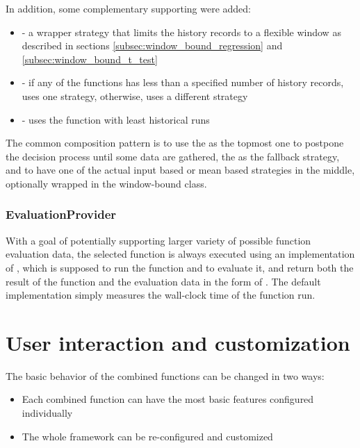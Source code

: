 In addition, some complementary supporting were added:
\begin{itemize}
	\item {} - a wrapper strategy that limits the history records to a flexible window as described in sections \ref{subsec:window_bound_regression} and \ref{subsec:window_bound_t_test}
\item {} - if any of the functions has less than a specified number of history records, uses one strategy, otherwise, uses a different strategy
\item {} - uses the function with least historical runs
\end{itemize}

The common composition pattern is to use the  as the topmost one to postpone the decision process until some data are gathered, the  as the fallback strategy, and to have one of the actual input based or mean based strategies in the middle, optionally wrapped in the window-bound class.

\subsubsection{EvaluationProvider}

With a goal of potentially supporting larger variety of possible function evaluation data, the selected function is always executed using an implementation of , which is supposed to run the function and to evaluate it, and return both the result of the function and the evaluation data in the form of . The default implementation simply measures the wall-clock time of the function run.

\section{User interaction and customization}

The basic behavior of the combined functions can be changed in two ways:
\begin{itemize}
	\item Each combined function can have the most basic features configured individually
	\item The whole framework can be re-configured and customized
\end{itemize}

